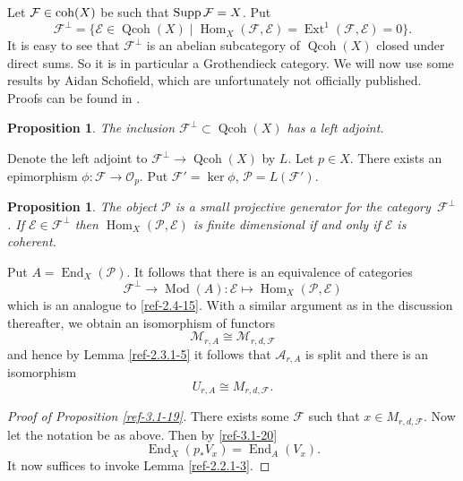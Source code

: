 \documentclass{amsart}
\numberwithin{equation}{section}
\let\cal\mathcal
\newtheorem{proposition}[lemma]{Proposition}
\theoremstyle{definition}
\theoremstyle{remark}
\begin{document}
Let ${{\cal F}}\in {\mathop{\text{\upshape{coh}}}}(X)$ be such that $\operatorname{\mathop{\text{\upshape Supp}}} {{\cal F}}=X$.  Put
\[
{{\cal F}}^\perp=\{{{\cal E}}\in {\operatorname{Qcoh}}(X)\mid
{\operatorname {Hom}}_X({{\cal F}},{{\cal E}})={\operatorname {Ext}}^1({{\cal F}},{{\cal E}})=0\}.
\]
It is easy to see that ${{\cal F}}^\perp$ is an abelian subcategory of ${\operatorname{Qcoh}}(X)$ closed
under direct sums. So it is in particular a Grothendieck category. We will now use
some results by Aidan Schofield, which are unfortunately not officially published.
Proofs can be found in \cite{schofieldup}.
\begin{proposition} \cite{schofieldup}
The inclusion ${{\cal F}}^\perp\subset {\operatorname{Qcoh}}(X)$ has a left adjoint.
\end{proposition}
Denote the left adjoint to ${{\cal F}}^\perp{\rightarrow} {\operatorname{Qcoh}}(X)$ by $L$.
Let $p\in X$. There exists
an epimorphism $\phi:{{\cal F}}{\rightarrow} {{\cal O}}_p$. Put ${{\cal F}}'={\operatorname {ker}} \phi$, ${{\cal P}}\overset{\text{}}{=}L({{\cal F}}')$.
\begin{proposition}\cite{schofieldup}
The object ${{\cal P}}$ is a small projective generator for the category~${{\cal F}}^\perp$. If ${{\cal E}}\in {{\cal F}}^\perp$ then ${\operatorname {Hom}}_X({{\cal P}},{{\cal E}})$
is finite dimensional if and only if ${{\cal E}}$ is coherent.
\end{proposition}
Put $A={\operatorname {End}}_X({{\cal P}})$. It follows that  there is an equivalence of categories
\begin{equation}
\label{ref-3.1-20}
{{\cal F}}^\perp{\rightarrow} {\operatorname{Mod}}(A):{{\cal E}}\mapsto {\operatorname {Hom}}_X({{\cal P}},{{\cal E}})
\end{equation}
which is an analogue to \eqref{ref-2.4-15}. With a similar argument as in the discussion thereafter, we obtain an isomorphism
of functors
\[
{{\cal M}}_{r,A}\cong {{\cal M}}_{r,d,{{\cal F}}}
\]
and hence by Lemma \ref{ref-2.3.1-5} it follows that ${{\cal A}}_{r,A}$ is split and there is an isomorphism
\[
U_{r,A}\cong M_{r,d,{{\cal F}}}.
\]
\begin{proof}[Proof of Proposition \ref{ref-3.1-19}] There exists some ${{\cal F}}$ such that
$x\in M_{r,d,{{\cal F}}}$. Now let the notation be as above. Then by \eqref{ref-3.1-20}
\[
{\operatorname {End}}_{X}(p_*V_x)={\operatorname {End}}_{A}(V_x).
\]
It now suffices to invoke Lemma \ref{ref-2.2.1-3}.
\end{proof}
\end{document}
